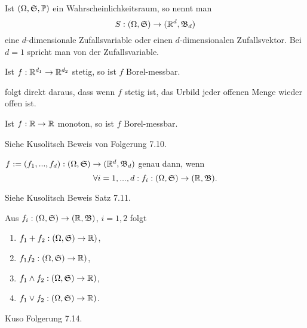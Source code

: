 			\begin{defi}
				Ist $(\Omega, \mathfrak{S}, \P)$ ein Wahrscheinlichkeitsraum, so nennt man
				\[ S:(\Omega,\mathfrak{S})\to(\R^d,\mathfrak{B}_d) \]
				eine $d$-dimensionale Zufallsvariable oder einen $d$-dimensionalen Zufallsvektor. Bei $d=1$ spricht man von der Zufallsvariable.
			\end{defi}
			
			\begin{satz}
				Ist $f:\R^{d_1}\to\R^{d_2}$ stetig, so ist $f$ Borel-messbar. 
			\end{satz}
			
			\begin{bew}
				folgt direkt daraus, dass wenn $f$ stetig ist, das Urbild jeder offenen Menge wieder offen ist. 
			\end{bew}
			
			\begin{satz}
				Ist $f:\R\to\R$ monoton, so ist $f$ Borel-messbar. 
			\end{satz}
			
			\begin{bew}
				Siehe Kusolitsch Beweis von Folgerung 7.10.
			\end{bew}
			
			\begin{satz}
				$f:=(f_1,...,f_d): (\Omega, \mf{S})\to(\R^d,\mathfrak{B}_d)$ genau dann, wenn 
				\[ \forall i=1,...,d: f_i:(\Omega,\mf{S})\to(\R,\mf{B}). \]
			\end{satz}
			
			\begin{bew}
				Siehe Kusolitsch Beweis Satz 7.11.
			\end{bew}
			
			\begin{satz}
				Aus $f_i: (\Omega,\mf{S})\to(\R,\mf{B})$, $i=1,2$ folgt
				\begin{enumerate}
					\item $f_1+f_2: (\Omega,\mf{S})\to \R)$,
					\item $f_1f_2: (\Omega,\mf{S})\to \R)$,
					\item $f_1\land f_2: (\Omega,\mf{S})\to \R)$,
					\item $f_1\lor f_2: (\Omega,\mf{S})\to \R)$.
				\end{enumerate}
			\end{satz}
			
			\begin{bew}
				Kuso Folgerung 7.14.
			\end{bew}
			

